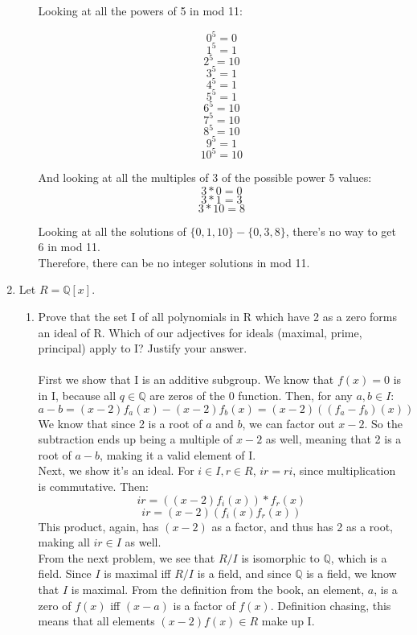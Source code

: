 \begin{enumerate}
\begin{enumerate}
    Looking at all the powers of 5 in mod 11:
    
    $$0^5 = 0$$
    $$1^5 = 1$$
    $$2^5 = 10$$
    $$3^5 = 1$$
    $$4^5 = 1$$
    $$5^5 = 1$$
    $$6^5 = 10$$
    $$7^5 = 10$$
    $$8^5 = 10$$
    $$9^5 = 1$$
    $$10^5 = 10$$
    
    And looking at all the multiples of 3 of the possible power 5 values:
    $$3*0 = 0$$
    $$3*1 = 3$$
    $$3*10 = 8$$
    
    Looking at all the solutions of $\{0,1,10\} - \{0,3,8\}$, there's no way to get 6 in mod 11.\\
    Therefore, there can be no integer solutions in mod 11.
    
    \end{enumerate}
    
    
    \item Let $R = \mathds{Q}[x]$.
        \begin{enumerate}
        \item Prove that the set I of all polynomials in R which have 2 as a zero forms an ideal of R. Which of our adjectives for ideals (maximal, prime, principal) apply to I? Justify your answer.\\\\

          First we show that I is an additive subgroup. We know that $f(x) = 0$ is in I, because all $q \in \mathds{Q}$ are zeros of the 0 function. Then, for any $a,b \in I$:
          $$a-b = (x-2)f_a(x) - (x-2)f_b(x) = (x-2)((f_a-f_b)(x))$$
          We know that since 2 is a root of $a$ and $b$, we can factor out $x-2$. So the subtraction ends up being a multiple of $x-2$ as well, meaning that 2 is a root of $a-b$, making it a valid element of I.\\

          Next, we show it's an ideal. For $i \in I, r \in R$, $ir = ri$, since multiplication is commutative. Then:
          $$ir = ((x-2)f_i(x))*f_r(x)$$
          $$ir = (x-2)(f_i(x)f_r(x))$$
          This product, again, has $(x-2)$ as a factor, and thus has 2 as a root, making all $ir \in I$ as well.\\

          From the next problem, we see that $R/I$ is isomorphic to $\mathds{Q}$, which is a field. Since $I$ is maximal iff $R/I$ is a field, and since $\mathds{Q}$ is a field, we know that $I$ is maximal. From the definition from the book, an element, $a$, is a zero of $f(x)$ iff $(x-a)$ is a factor of $f(x)$. Definition chasing, this means that all elements $(x-2)f(x) \in R$ make up I.\\


\end{enumerate}
\end{enumerate}
